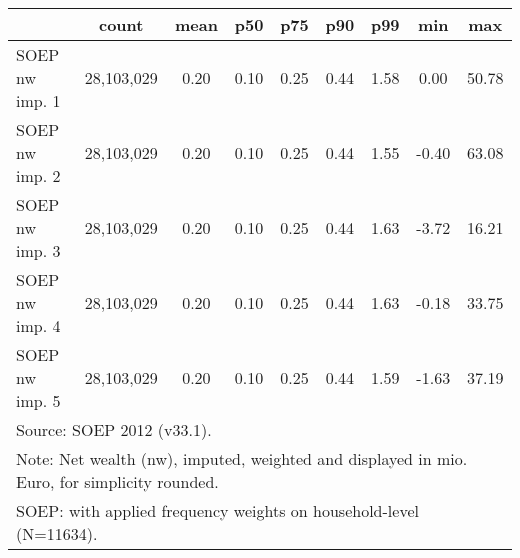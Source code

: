 {
\def\sym#1{\ifmmode^{#1}\else\(^{#1}\)\fi}
\begin{tabular}{l*{1}{cccccccc}}
\hline\hline
                                            &       count&        mean&         p50&         p75&         p90&         p99&         min&         max\\
\hline
SOEP nw imp. 1                              &  28,103,029&        0.20&        0.10&        0.25&        0.44&        1.58&        0.00&       50.78\\
SOEP nw imp. 2                              &  28,103,029&        0.20&        0.10&        0.25&        0.44&        1.55&       -0.40&       63.08\\
SOEP nw imp. 3                              &  28,103,029&        0.20&        0.10&        0.25&        0.44&        1.63&       -3.72&       16.21\\
SOEP nw imp. 4                              &  28,103,029&        0.20&        0.10&        0.25&        0.44&        1.63&       -0.18&       33.75\\
SOEP nw imp. 5                              &  28,103,029&        0.20&        0.10&        0.25&        0.44&        1.59&       -1.63&       37.19\\
\hline\hline
\multicolumn{9}{l}{\footnotesize Source: SOEP 2012 (v33.1).}\\
\multicolumn{9}{l}{\footnotesize Note: Net wealth (nw), imputed, weighted and displayed in mio. Euro, for simplicity rounded.}\\
\multicolumn{9}{l}{\footnotesize SOEP: with applied frequency weights on household-level (N=11634).}\\
\end{tabular}
}
